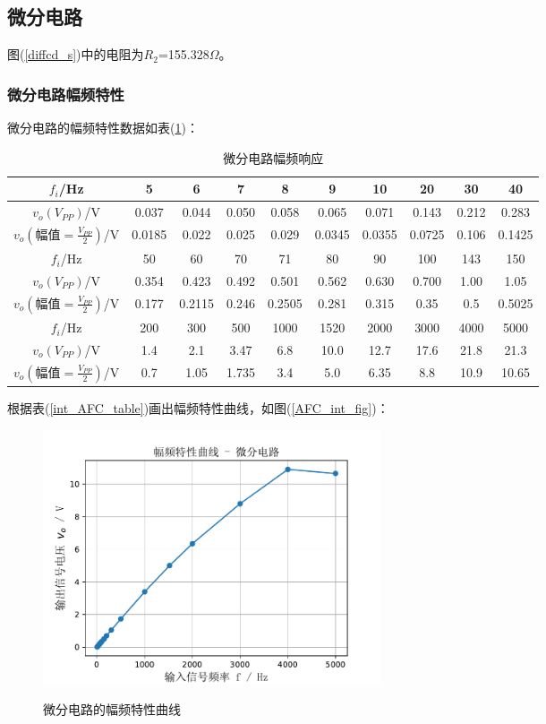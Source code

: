 \documentclass[a4paper]{article}
\begin{document}
\subsection{微分电路}
图(\ref{diffcd_s})中的电阻为$R_2$=155.328$\Omega$。
\subsubsection{微分电路幅频特性}
微分电路的幅频特性数据如表(\ref{diff_AFC_table})：
\begin{table}[!h]
\centering
\caption{微分电路幅频响应}
\label{diff_AFC_table}
\begin{tabular}{|c|c|c|c|c|c|c|c|c|c|}
\hline
\rowcolor[HTML]{EFEFEF} 
$f_i$/Hz                     & 5      & 6      & 7     & 8      & 9      & 10     & 20     & 30    & 40     \\ \hline
$v_o(V_{PP})$/V              & 0.037  & 0.044  & 0.050 & 0.058  & 0.065  & 0.071  & 0.143  & 0.212 & 0.283  \\ \hline
$v_o(幅值=\frac{V_{PP}}{2})$/V & 0.0185 & 0.022  & 0.025 & 0.029  & 0.0345 & 0.0355 & 0.0725 & 0.106 & 0.1425 \\ \hline
\rowcolor[HTML]{EFEFEF} 
$f_i$/Hz                     & 50     & 60     & 70    & 71     & 80     & 90     & 100    & 143   & 150    \\ \hline
$v_o(V_{PP})$/V              & 0.354  & 0.423  & 0.492 & 0.501  & 0.562  & 0.630  & 0.700  & 1.00  & 1.05   \\ \hline
$v_o(幅值=\frac{V_{PP}}{2})$/V & 0.177  & 0.2115 & 0.246 & 0.2505 & 0.281  & 0.315  & 0.35   & 0.5   & 0.5025 \\ \hline
\rowcolor[HTML]{EFEFEF} 
$f_i$/Hz                     & 200    & 300    & 500   & 1000   & 1520   & 2000   & 3000   & 4000  & 5000   \\ \hline
$v_o(V_{PP})$/V              & 1.4    & 2.1    & 3.47  & 6.8    & 10.0   & 12.7   & 17.6   & 21.8  & 21.3   \\ \hline
$v_o(幅值=\frac{V_{PP}}{2})$/V & 0.7    & 1.05   & 1.735 & 3.4    & 5.0    & 6.35   & 8.8    & 10.9  & 10.65  \\ \hline
\end{tabular}
\end{table}

根据表(\ref{int_AFC_table})画出幅频特性曲线，如图(\ref{AFC_int_fig})：
\begin{figure}[!h]
\centering
\includegraphics[width=10cm]{fig/AFC_diff.pdf}\\
\caption{微分电路的幅频特性曲线}\label{AFC_diff_fig}
\end{figure}
\end{document}
